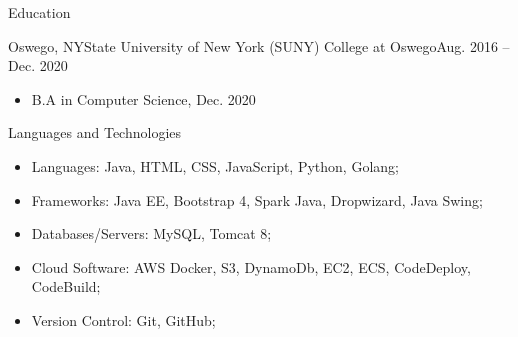 \documentclass[]{johnsoncv}
\begin{document}
	\makeheader
	
	
	\begin{cvsection}{Education}
		\begin{cvsubsection}{Oswego, NY}{State University of New York (SUNY) College at Oswego}{Aug. 2016 – Dec. 2020}
			\begin{itemize}
				\item B.A in Computer Science, Dec. 2020
			\end{itemize}
		\end{cvsubsection}
	\end{cvsection}

	\begin{cvsection}{Languages and Technologies}
		\begin{cvsubsection}{}{}{}	
			\begin{itemize}
				\item Languages: Java, HTML, CSS, JavaScript, Python, Golang;
				\item Frameworks: Java EE, Bootstrap 4, Spark Java, Dropwizard, Java Swing;
				\item Databases/Servers: MySQL, Tomcat 8;
				\item Cloud Software: AWS Docker, S3, DynamoDb, EC2, ECS, CodeDeploy, CodeBuild;
				\item Version Control: Git, GitHub;
			\end{itemize}
		\end{cvsubsection}
	\end{cvsection}

 
\end{document}
